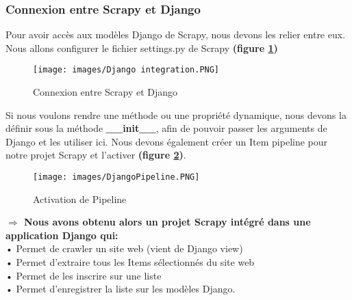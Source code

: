 \subsubsection{Connexion entre Scrapy et Django}
Pour avoir accès aux modèles Django de Scrapy, nous devons les relier entre eux. Nous allons configurer le fichier settings.py de Scrapy \textbf{(figure \ref{fig:Djangointe})}
\begin{figure}[H]
            \centering
            \texttt{[image: images/Django integration.PNG]}
            \caption{Connexion entre Scrapy et Django}
            \label{fig:Djangointe}  
        \end{figure}

Si nous voulons rendre une méthode ou une propriété dynamique, nous devons la définir sous la méthode \textbf{\_\_init\_\_}, afin de pouvoir passer les arguments de Django et les utiliser ici. Nous devons également créer un Item pipeline pour notre projet Scrapy et l'activer \textbf{(figure \ref{fig:Djangopip})}.
\begin{figure}[H]
            \centering
            \texttt{[image: images/DjangoPipeline.PNG]}
            \caption{Activation de Pipeline}
            \label{fig:Djangopip}  
        \end{figure}

\noindent\textbf{$\Rightarrow$ Nous avons obtenu alors un projet Scrapy intégré dans une application Django qui:}\\

\indent•  Permet de crawler un site web (vient de Django view)\\
\indent•  Permet d'extraire tous les Items sélectionnés  du site web\\
\indent• Permet de les inscrire sur une liste\\
\indent• Permet d'enregistrer la liste sur les modèles Django.
